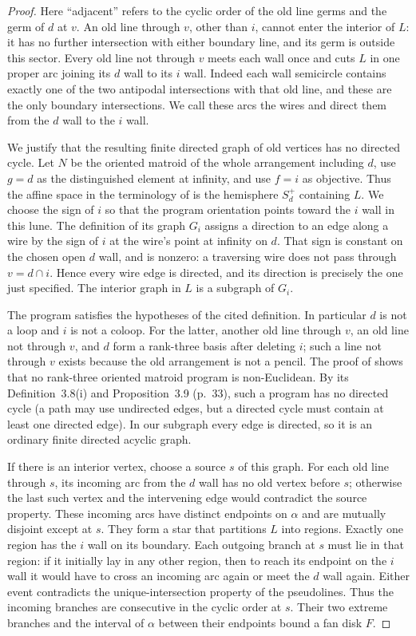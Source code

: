 \documentclass[11pt,a4paper]{article}
\begin{document}
\begin{proof}
Here ``adjacent'' refers to the cyclic order of the old line germs
and the germ of $d$ at $v$.  An old line through $v$, other than $i$,
cannot enter the interior of $L$: it has no further intersection
with either boundary line, and its germ is outside this sector.
Every old line not through $v$ meets each wall once and cuts $L$ in
one proper arc joining its $d$ wall to its $i$ wall.  Indeed each
wall semicircle contains exactly one of the two antipodal
intersections with that old line, and these are the only boundary
intersections.  We call these arcs the wires and direct them from
the $d$ wall to the $i$ wall.

We justify that the resulting finite directed graph of old vertices
has no directed cycle.  Let $N$ be the oriented matroid of the whole
arrangement including $d$, use $g=d$ as the distinguished element
at infinity, and use $f=i$ as objective.  Thus the affine space in
the terminology of \cite[pp.~30--31]{SZ1993} is the hemisphere
$S_d^+$ containing $L$.  We choose the sign of $i$ so that the
program orientation points toward the $i$ wall in this lune.  The
definition of its graph $G_i$ assigns a direction to an edge along
a wire by the sign of $i$ at the wire's point at infinity on $d$.
That sign is constant on the chosen open $d$ wall, and is nonzero:
a traversing wire does not pass through $v=d\cap i$.  Hence every
wire edge is directed, and its direction is precisely the one just
specified.  The interior graph in $L$ is a subgraph of $G_i$.

The program satisfies the hypotheses of the cited definition.  In
particular $d$ is not a loop and $i$ is not a coloop.  For the latter,
another old line through $v$, an old line not through $v$, and $d$
form a rank-three basis after deleting $i$; such a line not through
$v$ exists because the old arrangement is not a pencil.  The proof
of \cite[Corollary~4.5, p.~40]{SZ1993} shows that no rank-three
oriented matroid program is non-Euclidean.  By its Definition~3.8(i)
and Proposition~3.9 (p.~33), such a program has no directed cycle
(a path may use undirected edges, but a directed cycle must contain
at least one directed edge).  In our subgraph every edge is directed,
so it is an ordinary finite directed acyclic graph.

If there is an interior vertex, choose a source $s$ of this graph.
For each old line through $s$, its incoming arc from the $d$ wall
has no old vertex before $s$; otherwise the last such vertex and
the intervening edge would contradict the source property.  These
incoming arcs have distinct endpoints on $\alpha$ and are mutually
disjoint except at $s$.  They form a star that partitions $L$ into
regions.  Exactly one region has the $i$ wall on its boundary.  Each
outgoing branch at $s$ must lie in that region: if it initially lay
in any other region, then to reach its endpoint on the $i$ wall it
would have to cross an incoming arc again or meet the $d$ wall
again.  Either event contradicts the unique-intersection property
of the pseudolines.  Thus the incoming branches are consecutive in
the cyclic order at $s$.  Their two extreme branches and the
interval of $\alpha$ between their endpoints bound a fan disk $F$.


\end{proof}
\end{document}
